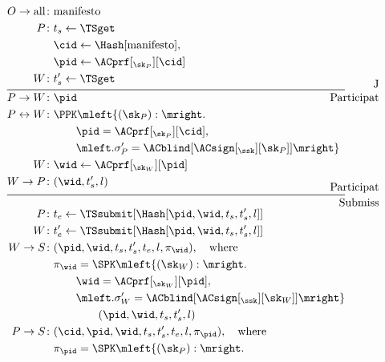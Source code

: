 \begin{columns}[t]
\begin{column}{0.32\linewidth}
    \begin{figure}
      \centering
      \begin{minipage}{\linewidth}
        \begin{align*}
          O\to \text{all}\colon & \text{manifesto} \\
          P\colon & t_s\gets \TSget \\
          & \cid\gets \Hash[\text{manifesto}], \\
          & \pid\gets \ACprf[_{\sk_P}][\cid] \\
          W\colon & t_s'\gets \TSget
          \\[-1em]
          \noalign{\hfill Join}
          \midrule
          \noalign{\hfill Participation}
          \\[-3em]
          P\to W\colon & \pid \\
          P\leftrightarrow W\colon &
          \PPK\mleft\{ (\sk_P) : \mright. \\
          & \qquad \pid = \ACprf[_{\sk_P}][\cid], \\
          & \qquad \mleft. \sigma_P' = \ACblind[\ACsign[_{\ssk}][\sk_P]] \mright\} 
          \\
          W\colon & \wid\gets \ACprf[_{\sk_W}][\pid] \\
          W\to P\colon & (\wid, t_s', l)
          \\[-1em]
          \noalign{\hfill Participation}
          \midrule
          \noalign{\hfill Submission}
          \\[-2em]
          P\colon & t_e\gets \TSsubmit[\Hash[\pid, \wid, t_s, t_s', l]] \\
          W\colon & t_e'\gets \TSsubmit[\Hash[\pid, \wid, t_s, t_s', l]] \\
          W\to S\colon & (\pid, \wid, t_s, t_s', t_e, l, \pi_{\wid}),\quad 
          \text{where} \\
          & \pi_{\wid} = \SPK\mleft\{ (\sk_W) : \mright. \\
          & \qquad \wid = \ACprf[_{\sk_W}][\pid], \\
          & \qquad \mleft. \sigma_W' = \ACblind[\ACsign[_{\ssk}][\sk_W]]\mright\} 
          \\
          & \qquad\qquad (\pid, \wid, t_s, t_s', l) \\
          P\to S\colon & (\cid, \pid, \wid, t_s, t_s', t_e, l, \pi_{\pid}),\quad 
          \text{where}\\
          & \pi_{\pid} = \SPK\mleft\{ (\sk_P) : \mright. \\

\end{align*}
\end{minipage}
\end{figure}
\end{column}
\end{columns}
